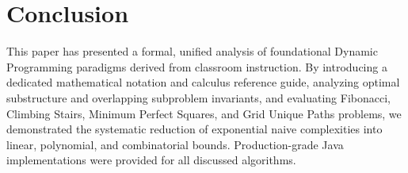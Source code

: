 \documentclass[10pt,journal,compsoc,onecolumn]{IEEEtran}
\begin{document}
\section{Conclusion}
\label{sec:conclusion}

This paper has presented a formal, unified analysis of foundational Dynamic Programming paradigms derived from classroom instruction. By introducing a dedicated mathematical notation and calculus reference guide, analyzing optimal substructure and overlapping subproblem invariants, and evaluating Fibonacci, Climbing Stairs, Minimum Perfect Squares, and Grid Unique Paths problems, we demonstrated the systematic reduction of exponential naive complexities into linear, polynomial, and combinatorial bounds. Production-grade Java implementations were provided for all discussed algorithms.
\end{document}
